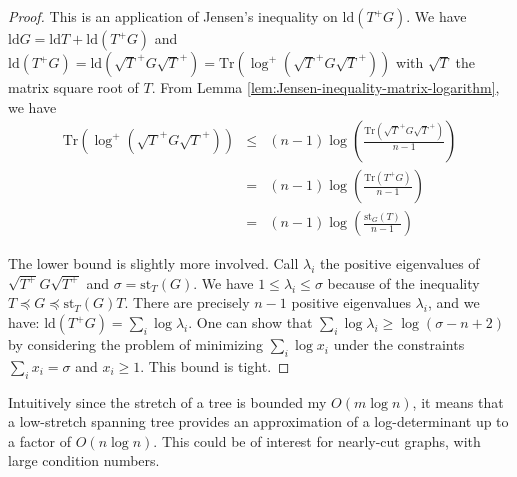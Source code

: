 \begin{proof} This is an application of Jensen's inequality on $\text{ld}\left(T^{+}G\right)$.
We have $\text{ld}G=\text{ld}T+\text{ld}\left(T^{+}G\right)$ and
$\text{ld}\left(T^{+}G\right)=\text{ld}\left(\sqrt{T}^{+}G\sqrt{T}^{+}\right)=\text{Tr}\left(\log^{+}\left(\sqrt{T}^{+}G\sqrt{T}^{+}\right)\right)$
with $\sqrt{T}$ the matrix square root of $T$. From Lemma \ref{lem:Jensen-inequality-matrix-logarithm},
we have 
\begin{eqnarray*}
\text{Tr}\left(\log^{+}\left(\sqrt{T}^{+}G\sqrt{T}^{+}\right)\right) & \leq & \left(n-1\right)\log\left(\frac{\text{Tr}\left(\sqrt{T}^{+}G\sqrt{T}^{+}\right)}{n-1}\right)\\
 & = & \left(n-1\right)\log\left(\frac{\text{Tr}\left(T^{+}G\right)}{n-1}\right)\\
 & = & \left(n-1\right)\log\left(\frac{\text{st}_{G}\left(T\right)}{n-1}\right)
\end{eqnarray*}


The lower bound is slightly more involved. Call $\lambda_{i}$ the
positive eigenvalues of $\sqrt{T^{+}}G\sqrt{T^{+}}$ and $\sigma=\text{st}_{T}\left(G\right)$.
We have $1\leq\lambda_{i}\leq\sigma$ because of the inequality$T\preceq G\preceq\text{st}_{T}\left(G\right)T$.
There are precisely $n-1$ positive eigenvalues $\lambda_{i}$, and
we have: $\text{ld}\left(T^{+}G\right)=\sum_{i}\log\lambda_{i}$.
One can show that $\sum_{i}\log\lambda_{i}\geq\log\left(\sigma-n+2\right)$
by considering the problem of minimizing $\sum_{i}\log x_{i}$ under
the constraints $\sum_{i}x_{i}=\sigma$ and $x_{i}\geq1$. This bound
is tight. \end{proof} Intuitively since the stretch of a tree is
bounded my $O\left(m\log n\right)$, it means that a low-stretch spanning
tree provides an approximation of a log-determinant up to a factor
of $O\left(n\log n\right)$. This could be of interest for nearly-cut
graphs, with large condition numbers.



